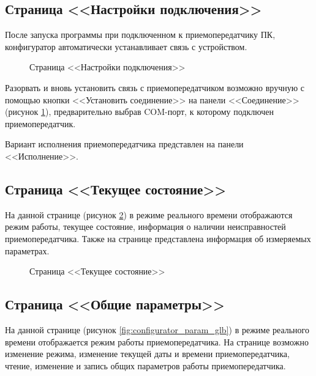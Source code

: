 	
\subsection{Страница <<Настройки подключения>>}	\label{ssec:configurator_connect}

После запуска программы при подключенном к приемопередатчику ПК, конфигуратор автоматически устанавливает связь с устройством. 

\begin{figure}[H]
	
	\caption{Страница <<Настройки подключения>>}
	\label{fig:configurator_connect}
\end{figure}

Разорвать и вновь установить связь с приемопередатчиком возможно вручную с помощью кнопки <<Установить соединение>> на панели <<Соединение>> (рисунок \ref{fig:configurator_connect}), предварительно выбрав COM-порт, к которому подключен приемопередатчик. 

Вариант исполнения приемопередатчика представлен на панели <<Исполнение>>. 	
	
	
\subsection{Страница <<Текущее состояние>>}	\label{ssec:configurator_state}

На данной странице (рисунок \ref{fig:configurator_state}) в режиме реального времени отображаются режим работы, текущее состояние, информация о наличии неисправностей приемопередатчика. Также на странице представлена информация об измеряемых параметрах.

\begin{figure}[H]
	
	\caption{Страница <<Текущее состояние>>}
	\label{fig:configurator_state}
\end{figure}


\subsection{Страница <<Общие параметры>>}	\label{ssec:configurator_param_glb}

На данной странице (рисунок \ref{fig:configurator_param_glb}) в режиме реального времени отображается режим работы приемопередатчика. На странице возможно изменение режима, изменение текущей даты и времени приемопередатчика, чтение, изменение и запись общих параметров работы приемопередатчика.

